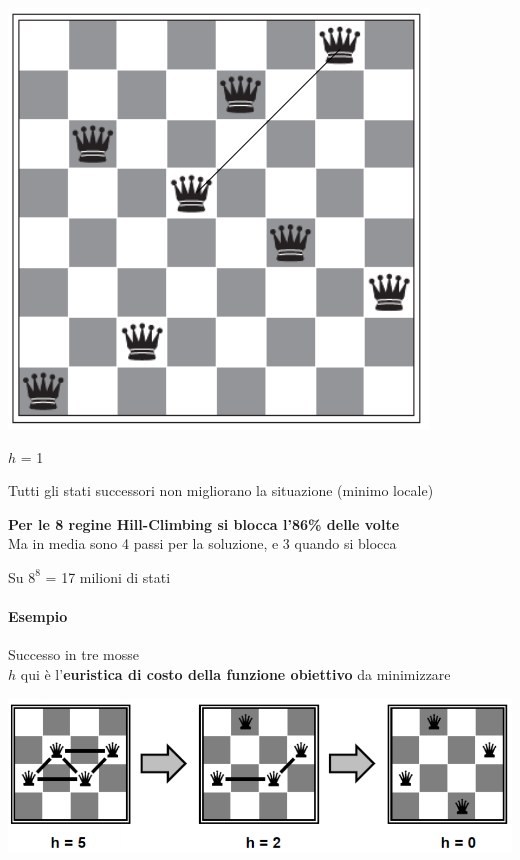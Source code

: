 \documentclass[10pt]{book}
\begin{document}
\begin{multicols}{2}
\begin{center}
	\includegraphics[scale=0.6]{8regstatcomp2.png}
\end{center}
\begin{list}{}{\textbf{Un minimo locale}}
		\item $h$ = 1
		\item Tutti gli stati successori non migliorano la situazione (minimo locale)
		\item \textbf{Per le 8 regine Hill-Climbing si blocca l'86\% delle volte}\\
		Ma in media sono 4 passi per la soluzione, e 3 quando si blocca
		\item Su $8^8$ = 17 milioni di stati
\end{list}
\end{multicols}
\paragraph{Esempio} Successo in tre mosse\\
$h$ qui è l'\textbf{euristica di costo della funzione obiettivo} da minimizzare
\begin{center}
	\includegraphics[scale=0.75]{8regine3passi.png}
\end{center}
\pagebreak
\end{document}
